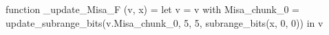 function _update_Misa_F (v, x) = let v = { v with Misa_chunk_0 = update_subrange_bits(v.Misa_chunk_0, 5, 5, subrange_bits(x, 0, 0)) } in
  v
